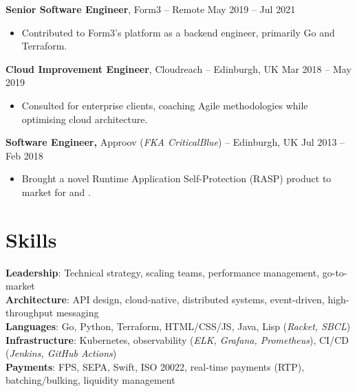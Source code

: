 \documentclass[11pt]{article}       %
\begin{document}
\textbf{Senior Software Engineer}, Form3 -- Remote \hfill May 2019 -- Jul 2021 \\
\vspace{-9pt}
\begin{itemize}
  \item Contributed to Form3's platform as a backend engineer, primarily Go and Terraform. \\
\end{itemize}

\textbf{Cloud Improvement Engineer}, Cloudreach -- Edinburgh, UK \hfill Mar 2018 -- May 2019 \\
\vspace{-9pt}
\begin{itemize}
  \item Consulted for enterprise clients, coaching Agile methodologies while optimising cloud architecture. \\
\end{itemize}

\textbf{Software Engineer,} Approov (\textit{FKA CriticalBlue}) -- Edinburgh, UK \hfill Jul 2013 -- Feb 2018 \\
\vspace{-9pt}
\begin{itemize}
  \item Brought a novel Runtime Application Self-Protection (RASP) product to market for  and . \\
\end{itemize}

\section*{Skills}
\textbf{Leadership}: Technical strategy, scaling teams, performance management, go-to-market \\
\textbf{Architecture}: API design, cloud-native, distributed systems, event-driven, high-throughput messaging \\
\textbf{Languages}: Go, Python, Terraform, HTML/CSS/JS, Java, Lisp (\textit{Racket, SBCL}) \\
\textbf{Infrastructure}: Kubernetes, observability (\textit{ELK, Grafana, Prometheus}), CI/CD (\textit{Jenkins, GitHub Actions}) \\
\textbf{Payments}: FPS, SEPA, Swift, ISO 20022, real-time payments (RTP), batching/bulking, liquidity management \\

\vspace{-6.5pt}
\end{document}
